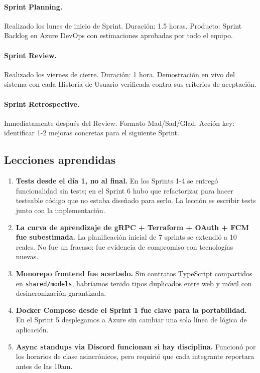 \documentclass[12pt,a4paper,oneside]{article}
\begin{document}
\paragraph{Sprint Planning.} Realizado los lunes de inicio de Sprint. Duraci\'on: 1.5 horas. Producto: Sprint Backlog en Azure DevOps con estimaciones aprobadas por todo el equipo.

\paragraph{Sprint Review.} Realizado los viernes de cierre. Duraci\'on: 1 hora. Demostraci\'on en vivo del sistema con cada Historia de Usuario verificada contra sus criterios de aceptaci\'on.

\paragraph{Sprint Retrospective.} Inmediatamente despu\'es del Review. Formato Mad/Sad/Glad. Acci\'on key: identificar 1-2 mejoras concretas para el siguiente Sprint.

\subsection{Lecciones aprendidas}

\begin{enumerate}[leftmargin=*]
  \item \textbf{Tests desde el d\'ia 1, no al final.} En los Sprints 1-4 se entreg\'o funcionalidad sin tests; en el Sprint 6 hubo que refactorizar para hacer testeable c\'odigo que no estaba dise\~nado para serlo. La lecci\'on es escribir tests junto con la implementaci\'on.
  \item \textbf{La curva de aprendizaje de gRPC + Terraform + OAuth + FCM fue subestimada.} La planificaci\'on inicial de 7 sprints se extendi\'o a 10 reales. No fue un fracaso: fue evidencia de compromiso con tecnolog\'ias nuevas.
  \item \textbf{Monorepo frontend fue acertado.} Sin contratos TypeScript compartidos en \texttt{shared/models}, habr\'iamos tenido tipos duplicados entre web y m\'ovil con desincronizaci\'on garantizada.
  \item \textbf{Docker Compose desde el Sprint 1 fue clave para la portabilidad.} En el Sprint 5 desplegamos a Azure sin cambiar una sola l\'inea de l\'ogica de aplicaci\'on.
  \item \textbf{Async standups via Discord funcionan si hay disciplina.} Funcion\'o por los horarios de clase asincr\'onicos, pero requiri\'o que cada integrante reportara antes de las 10am.
\end{enumerate}
\end{document}
